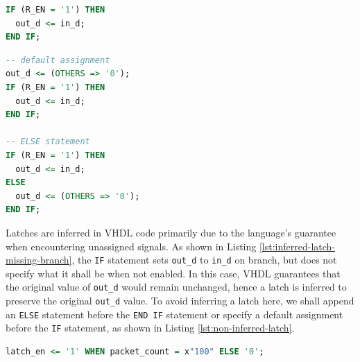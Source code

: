 \documentclass[a4paper]{report}
\newcommand{\proglang}{\textsf}
\newcommand{\code}{\texttt}
\begin{document}
\begin{minipage}{.45\textwidth}
\begin{lstlisting}[language=VHDL, caption=Inferred Latch with missing branch in \proglang{VHDL}, label={lst:inferred-latch-missing-branch}]
IF (R_EN = '1') THEN
  out_d <= in_d;
END IF;
\end{lstlisting}
\end{minipage}\hfill
\begin{minipage}{.45\textwidth}
\begin{lstlisting}[language=VHDL, caption=Inferred Latch with incomplete assignment, label={lst:non-inferred-latch}]
-- default assignment 
out_d <= (OTHERS => '0');
IF (R_EN = '1') THEN
  out_d <= in_d;
END IF;

-- ELSE statement
IF (R_EN = '1') THEN
  out_d <= in_d;
ELSE
  out_d <= (OTHERS => '0');
END IF;
\end{lstlisting}
\end{minipage}

Latches are inferred in \proglang{VHDL} code primarily due to the language's guarantee when encountering unassigned signals. As shown in Listing \ref{lst:inferred-latch-missing-branch}, the \code{IF} statement sets \code{out\_d} to \code{in\_d} on branch, but does not specify what it shall be when not enabled. In this case, \proglang{VHDL} guarantees that the original value of \code{out\_d} would remain unchanged, hence a latch is inferred to preserve the original \code{out\_d} value. To avoid inferring a latch here, we shall append an \code{ELSE} statement before the \code{END IF} statement or specify a default assignment before the \code{IF} statement, as shown in Listing \ref{lst:non-inferred-latch}.

\begin{lstlisting}[language=VHDL, caption=An sample latch set on packet counter reaching $\mathtt{0x100}$, label={lst:sample-latch-issue}]
latch_en <= '1' WHEN packet_count = x"100" ELSE '0';
\end{lstlisting}
\end{document}
